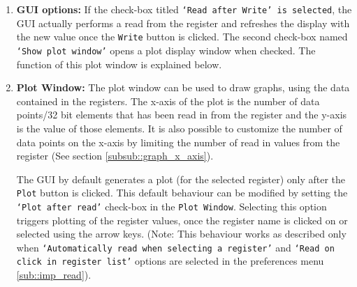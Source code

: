 \begin{enumerate}
	\item \textbf{GUI options:} If the check-box titled \texttt{`Read after Write'
    is selected}, the GUI actually performs a read from the register and
    refreshes the display with the new value once the \texttt{Write} button is
    clicked. The second check-box named \texttt{`Show plot window'} opens a plot
    display window when checked. The function of this  plot window is explained
    below.

	\item \textbf{Plot Window:} The plot window can be used to draw graphs, using
    the data contained in the registers. The x-axis of the plot is the number of
    data points/32 bit elements that has been read in from the register and the
    y-axis is the value of those elements. It is also possible to customize the
    number of data points on the x-axis by limiting the number of read in values
    from the register (See section \ref{subsub::graph_x_axis}).

	The GUI by default generates a plot (for the selected register) only after the
	\texttt{Plot} button is clicked. This default behaviour can be modified by
	setting the \texttt{`Plot after read'} check-box in the \texttt{Plot Window}.
	Selecting this option triggers plotting of the register values, once the
	register name is clicked on or selected using the arrow keys. (Note: This
	behaviour works as described only when \texttt{`Automatically read when
	selecting a register'} and \texttt{`Read on click in register list'} options are
	selected in the preferences menu \ref{sub::imp_read}).
	

\end{enumerate}


